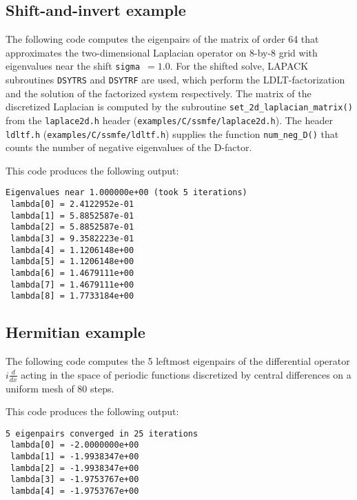 \subsection{Shift-and-invert example}
\label{sec:ex.si}

The following code 
computes the eigenpairs of 
the matrix of order 64 that approximates 
the two-dimensional Laplacian operator
on 8-by-8 grid
with eigenvalues near the shift {\tt sigma $=1.0$}.
For the shifted solve, LAPACK subroutines {\tt DSYTRS} and
{\tt DSYTRF} are used,
which perform the LDLT-factorization and
the solution of the factorized system respectively.
The matrix of the discretized Laplacian is computed
by the subroutine {\tt set\_2d\_laplacian\_matrix()}
from the {\tt laplace2d.h} header (\texttt{examples/C/ssmfe/laplace2d.h}).
The header {\tt ldltf.h} (\texttt{examples/C/ssmfe/ldltf.h}) supplies
the function {\tt num\_neg\_D()}
that counts the number of negative eigenvalues of
the D-factor.

This code produces the following output:
\begin{verbatim}
Eigenvalues near 1.000000e+00 (took 5 iterations)
 lambda[0] = 2.4122952e-01
 lambda[1] = 5.8852587e-01
 lambda[2] = 5.8852587e-01
 lambda[3] = 9.3582223e-01
 lambda[4] = 1.1206148e+00
 lambda[5] = 1.1206148e+00
 lambda[6] = 1.4679111e+00
 lambda[7] = 1.4679111e+00
 lambda[8] = 1.7733184e+00
\end{verbatim}

\subsection{Hermitian example}
\label{sec:ex.h}

The following code 
computes the 5 leftmost eigenpairs of 
the differential operator $i \frac{d}{dx}$
acting in the space of periodic functions
discretized by central differences on a uniform mesh
of 80 steps.

This code produces the following output:
\begin{verbatim}
5 eigenpairs converged in 25 iterations
 lambda[0] = -2.0000000e+00
 lambda[1] = -1.9938347e+00
 lambda[2] = -1.9938347e+00
 lambda[3] = -1.9753767e+00
 lambda[4] = -1.9753767e+00
\end{verbatim}
